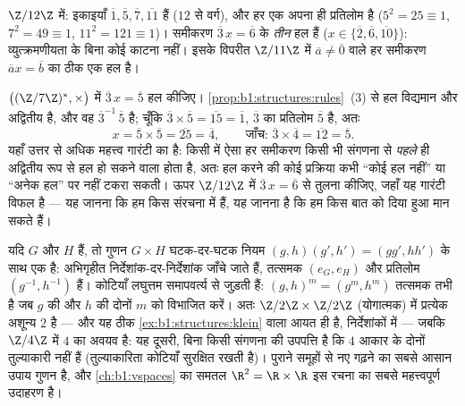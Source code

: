 \begin{example}[$\Z/n\Z$ में संगणना]\label{ex:b1:structures:zncomputation}
$\Z/12\Z$ में: इकाइयाँ $\overline 1, \overline 5, \overline 7,
\overline{11}$ हैं ($12$ से  वर्ग), और हर एक अपना ही प्रतिलोम है
($5^2 = 25 \equiv 1$, $7^2 = 49 \equiv 1$, $11^2 = 121 \equiv 1$)। समीकरण
$\overline 3\, x = \overline 6$ के \emph{तीन} हल हैं ($x \in \{\overline 2,
\overline 6, \overline{10}\}$): व्युत्क्रमणीयता के बिना कोई काटना नहीं। इसके
विपरीत $\Z/11\Z$ में $\overline a \neq \overline 0$ वाले हर समीकरण
$\overline a x = \overline b$ का ठीक एक हल है।
\end{example}

\begin{example}[समूह अभिगृहीत हल करने की अनुमति के रूप में]\label{ex:b1:structures:solving}
 $\bigl((\Z/7\Z)^*, \times\bigr)$ में $\overline 3\,x = \overline 5$ हल
कीजिए। \cref{prop:b1:structures:rules}~(3) से हल विद्यमान और अद्वितीय है, और
वह $\overline3^{-1}\, \overline5$ है; चूँकि $\overline3 \times \overline5 =
\overline{15} = \overline1$, $\overline 3$ का प्रतिलोम $\overline 5$ है, अतः
\[
x = \overline5 \times \overline5 = \overline{25} = \overline4,
\qquad\text{जाँच: } \overline3 \times \overline4 =
\overline{12} = \overline5 .
\]
यहाँ उत्तर से अधिक महत्त्व गारंटी का है: किसी  में ऐसा हर समीकरण किसी भी
संगणना से \emph{पहले} ही अद्वितीय रूप से हल हो सकने वाला होता है, अतः हल
करने की कोई प्रक्रिया कभी ``कोई हल नहीं'' या ``अनेक हल'' पर नहीं टकरा सकती।
ऊपर $\Z/12\Z$ में $\overline3\,x = \overline6$ से तुलना कीजिए, जहाँ यह
गारंटी विफल है --- यह जानना कि हम किस संरचना में हैं, यह जानना है कि हम किस
बात को दिया हुआ मान सकते हैं।
\end{example}

\begin{example}[प्रत्यक्ष गुणन]\label{ex:b1:structures:product}
यदि $G$ और $H$  हैं, तो गुणन  $G \times H$ घटक-दर-घटक नियम $(g,
h)(g', h') = (gg', hh')$ के साथ एक  है: अभिगृहीत
निर्देशांक-दर-निर्देशांक जाँचे जाते हैं, तत्समक $(e_G, e_H)$ और प्रतिलोम
$(g^{-1}, h^{-1})$ हैं। कोटियाँ लघुत्तम समापवर्त्य से जुड़ती हैं: $(g, h)^m
= (g^m, h^m)$ तत्समक तभी है जब $g$ की  और $h$ की  दोनों $m$ को
विभाजित करें। अतः $\Z/2\Z \times \Z/2\Z$ (योगात्मक) में प्रत्येक अशून्य  $2$ है --- और यह ठीक \cref{ex:b1:structures:klein} वाला आयत  ही
है, निर्देशांकों में --- जबकि $\Z/4\Z$ में  $4$ का अवयव है: यह दूसरी,
बिना किसी संगणना की उपपत्ति है कि $4$ आकार के दोनों  तुल्याकारी नहीं हैं
(तुल्याकारिता कोटियाँ सुरक्षित रखती है)। पुराने समूहों से नए  गढ़ने का
सबसे आसान उपाय गुणन है, और \cref{ch:b1:vspaces} का समतल $\R^2 = \R \times
\R$ इस रचना का सबसे महत्त्वपूर्ण उदाहरण है।
\end{example}

